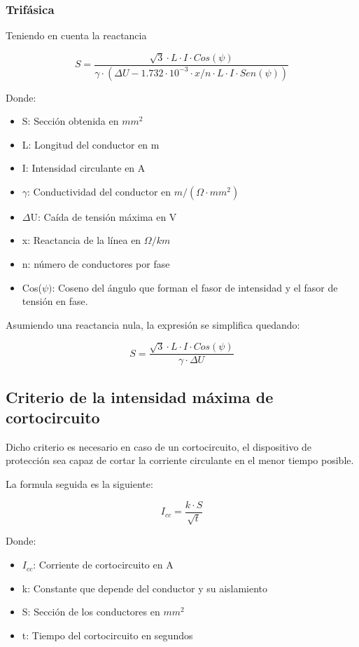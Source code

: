 \documentclass[../main.tex]{subfiles}
\begin{document}
\subsubsection{Trifásica}

Teniendo en cuenta la reactancia 

\begin{equation}
    S = \frac{\sqrt{3}\cdot L\cdot I\cdot Cos(\psi)}{\gamma\cdot (\Delta U-1.732\cdot 10^{-3} \cdot  x/n \cdot  L\cdot  I \cdot  Sen(\psi) )}
\end{equation}

Donde:
\begin{itemize}
    \item S: Sección obtenida en $mm^2$ 
    \item L: Longitud del conductor en m
    \item I: Intensidad circulante en A
    \item $\gamma$: Conductividad del conductor en $m/(\Omega\cdot mm^2)$
    \item $\Delta $U: Caída de tensión máxima en V
    \item x: Reactancia de la línea en $\Omega/km$
    \item n: número de conductores por fase
    \item Cos($\psi)$: Coseno del ángulo que forman el fasor de intensidad y el fasor de tensión en fase.
\end{itemize}

Asumiendo una reactancia nula, la expresión se simplifica quedando:

\begin{equation}
    S = \frac{\sqrt{3}\cdot L\cdot I\cdot Cos(\psi)}{\gamma\cdot \Delta U}
\end{equation}

\subsection{Criterio de la intensidad máxima de cortocircuito}

Dicho criterio es necesario en caso de un cortocircuito, el dispositivo de protección sea capaz de cortar la corriente circulante en el menor tiempo posible. 

La formula seguida es la siguiente:

\begin{equation}
    I_{cc} = \frac{k\cdot S}{\sqrt{t}}
\end{equation}

Donde:
\begin{itemize}
    \item $I_{cc}$: Corriente de cortocircuito en A
    \item k: Constante que depende del conductor y su aislamiento
    \item S: Sección de los conductores en $mm^2$
    \item t: Tiempo del cortocircuito en segundos
\end{itemize}
\end{document}
